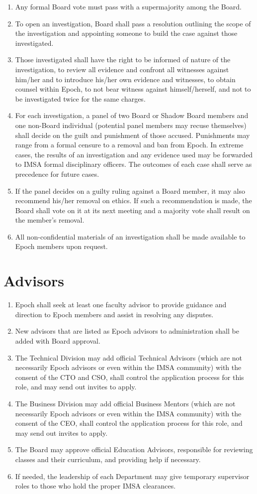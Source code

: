 \documentclass{article}
\begin{document}
\begin{enumerate}
    \item Any formal Board vote must pass with a supermajority among the Board.
    \item To open an investigation, Board shall pass a resolution outlining the scope of the investigation and appointing someone to build the case against those investigated. 
    \item Those investigated shall have the right to be informed of nature of the investigation, to review all evidence and confront all witnesses against him/her and to introduce his/her own evidence and witnesses, to obtain counsel within Epoch, to not bear witness against himself/herself, and not to be investigated twice for the same charges.
    \item For each investigation, a panel of two Board or Shadow Board members and one non-Board individual (potential panel members may recuse themselves) shall decide on the guilt and punishment of those accused. Punishments may range from a formal censure to a removal and ban from Epoch. In extreme cases, the results of an investigation and any evidence used may be forwarded to IMSA formal disciplinary officers. The outcomes of each case shall serve as precedence for future cases.
    \item If the panel decides on a guilty ruling against a Board member, it may also recommend his/her removal on ethics. If such a recommendation is made, the Board shall vote on it at its next meeting and a majority vote shall result on the member's removal.
    \item All non-confidential materials of an investigation shall be made available to Epoch members upon request.
\end{enumerate}
\section{Advisors}
\begin{enumerate}
    \item Epoch shall seek at least one faculty advisor to provide guidance and direction to Epoch members and assist in resolving any disputes.
    \item New advisors that are listed as Epoch advisors to administration shall be added with Board approval.
    \item The Technical Division may add official Technical Advisors (which are not necessarily Epoch advisors or even within the IMSA community) with the consent of the CTO and CSO, shall control the application process for this role, and may send out invites to apply.
    \item The Business Division may add official Business Mentors (which are not necessarily Epoch advisors or even within the IMSA community) with the consent of the CEO, shall control the application process for this role, and may send out invites to apply.
    \item The Board may approve official Education Advisors, responsible for reviewing classes and their curriculum, and providing help if necessary.
    \item If needed, the leadership of each Department may give temporary supervisor roles to those who hold the proper IMSA clearances.
\end{enumerate}
\end{document}
